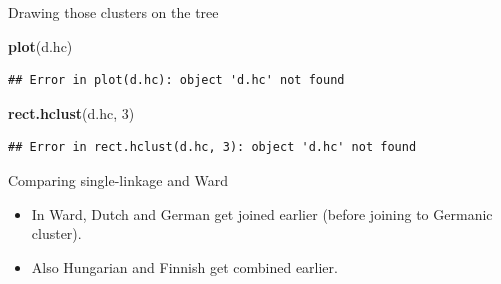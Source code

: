 \documentclass[ignorenonframetext,]{beamer}
\newenvironment{Shaded}{\begin{snugshade}}{\end{snugshade}}
\newcommand{\DecValTok}[1]{\textcolor[rgb]{0.00,0.00,0.81}{#1}}
\newcommand{\KeywordTok}[1]{\textcolor[rgb]{0.13,0.29,0.53}{\textbf{#1}}}
\newcommand{\NormalTok}[1]{#1}
\begin{document}
\begin{frame}[fragile]{Drawing those clusters on the tree}
\protect\hypertarget{drawing-those-clusters-on-the-tree}{}

\begin{Shaded}
\begin{Highlighting}[]
\KeywordTok{plot}\NormalTok{(d.hc)}
\end{Highlighting}
\end{Shaded}

\begin{verbatim}
## Error in plot(d.hc): object 'd.hc' not found
\end{verbatim}

\begin{Shaded}
\begin{Highlighting}[]
\KeywordTok{rect.hclust}\NormalTok{(d.hc, }\DecValTok{3}\NormalTok{)}
\end{Highlighting}
\end{Shaded}

\begin{verbatim}
## Error in rect.hclust(d.hc, 3): object 'd.hc' not found
\end{verbatim}

\end{frame}

\begin{frame}{Comparing single-linkage and Ward}
\protect\hypertarget{comparing-single-linkage-and-ward}{}

\begin{itemize}
\item
  In Ward, Dutch and German get joined earlier (before joining to
  Germanic cluster).
\item
  Also Hungarian and Finnish get combined earlier.
\end{itemize}

\end{frame}
\end{document}
